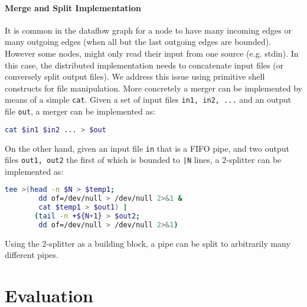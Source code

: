 \documentclass[sigplan,10pt,review,anonymous]{acmart}
\newcommand{\ttt}[1]{\texttt{\small #1}}
\newcommand{\kk}[1]{[{\color{magenta}#1 --- kk}]}
\newcommand{\tr}[1]{} %
\begin{document}
\paragraph{Merge and Split Implementation}
%
It is common in the dataflow graph for a node to have many incoming
edges or many outgoing edges (when all but the last outgoing edges
are bounded). However some nodes, might only read their input from one
source (e.g. stdin). In this case, the distributed implementation
needs to concatenate input files (or conversely split output
files).
%
%
We address this issue using primitive shell constructs for file
manipulation. More concretely a merger can be implemented by means of a simple
\ttt{cat}. Given a set of input files \ttt{in1, in2, ...} and an
output file \ttt{out}, a merger can be implemented as:

\begin{lstlisting}[language=sh, float=h, numbers=none]
 cat $in1 $in2 ... > $out
\end{lstlisting}

\noindent
On the other hand, given an input file \ttt{in} that is a FIFO pipe,
and two output files \ttt{out1, out2} the first of which is bounded
to \ttt{|N} lines, a 2-splitter can be implemented as:

\begin{lstlisting}[language=sh, float=h, numbers=none]
  tee >(head -n $N > $temp1;
        dd of=/dev/null > /dev/null 2>&1 &
        cat $temp1 > $out1) |
       (tail -n +${N+1} > $out2;
        dd of=/dev/null > /dev/null 2>&1)
\end{lstlisting}

\noindent
Using the 2-splitter as a building block, a pipe can be split to
arbitrarily many different pipes.


\section{Evaluation}
\label{eval}

% 
% 
% 
% 
% 
\end{document}
